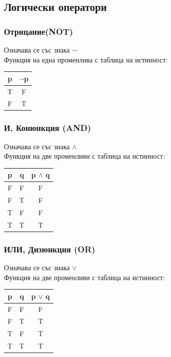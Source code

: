 \documentclass[fleqn, 12pt]{article}
\theoremstyle{definition}
\begin{document}
\subsection{Логически оператори}

\subsubsection{Отрицание(NOT)}
Означава се със знака $\neg$\\
Функция на една променлива с таблица на истинност: 
\begin{table}[htp]
  \begin{center}
    \begin{tabular}{|c|c|} 
\hline
      \textbf{p} & \textbf{$\neg$p} \\
      \hline
      T & F \\
\hline
      F & T \\
\hline
    \end{tabular}
  \end{center}
\end{table}

\subsubsection{И, Конюнкция (AND)}
Означава се със знака $\land$\\
Функция на две променливи с таблица на истинност: 
\begin{table}[htp]
  \begin{center}
    \begin{tabular}{|c|c|c|} 
\hline
      \textbf{p} & \textbf{q}  & \textbf{p $\land$ q} \\
      \hline
	F & F & F \\
\hline
	F & T & F \\
\hline
	T & F & F \\
\hline
 	T & T & T \\
\hline
    \end{tabular}
  \end{center}
\end{table}

\subsubsection{ИЛИ, Дизюнкция (OR)}
Означава се със знака $\lor$\\
Функция на две променливи с таблица на истинност: 
\begin{table}[htp]
  \begin{center}
    \begin{tabular}{|c|c|c|} 
\hline
      \textbf{p} & \textbf{q}  & \textbf{p $\lor$ q} \\
      \hline
	F & F & F \\
\hline
	F & T & T \\
\hline
	T & F & T \\
\hline
 	T & T & T \\
\hline
    \end{tabular}
  \end{center}
\end{table}
\end{document}
